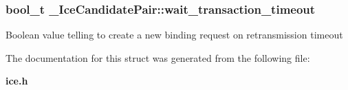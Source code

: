 \subsubsection[{wait\-\_\-transaction\-\_\-timeout}]{\setlength{\rightskip}{0pt plus 5cm}bool\-\_\-t \-\_\-\-Ice\-Candidate\-Pair\-::wait\-\_\-transaction\-\_\-timeout}\label{struct__IceCandidatePair_a427bbb087d9ed087d3388e4e4e3af46c}
Boolean value telling to create a new binding request on retransmission timeout 

The documentation for this struct was generated from the following file\-:\begin{DoxyCompactItemize}
\item 
{\bf ice.\-h}\end{DoxyCompactItemize}
